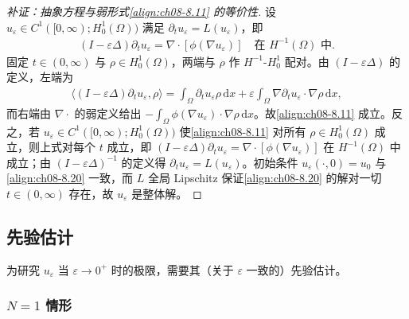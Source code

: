\documentclass[../../main.tex]{subfiles}%
\begin{document}
\begin{proof}[补证：抽象方程与弱形式\eqref{align:ch08-8.11} 的等价性]
设 $u_\varepsilon\in C^1([0,\infty);H^1_0(\Omega))$ 满足 $\partial_tu_\varepsilon=L(u_\varepsilon)$，即
\begin{align*}
(I-\varepsilon\Delta)\partial_tu_\varepsilon=\nabla\cdot[\phi(\nabla u_\varepsilon)]
\quad\text{在 }H^{-1}(\Omega)\text{ 中}.
\end{align*}
固定 $t\in(0,\infty)$ 与 $\rho\in H^1_0(\Omega)$，两端与 $\rho$ 作 $H^{-1}$-$H^1_0$ 配对。由 $(I-\varepsilon\Delta)$ 的定义，左端为
\begin{align*}
\langle(I-\varepsilon\Delta)\partial_tu_\varepsilon,\rho\rangle
=\int_\Omega\partial_tu_\varepsilon\rho\,\mathrm{d}x
+\varepsilon\int_\Omega\nabla\partial_tu_\varepsilon\cdot\nabla\rho\,\mathrm{d}x,
\end{align*}
而右端由 $\nabla\cdot$ 的弱定义给出 $-\int_\Omega\phi(\nabla u_\varepsilon)\cdot\nabla\rho\,\mathrm{d}x$。故\eqref{align:ch08-8.11} 成立。反之，若 $u_\varepsilon\in C^1([0,\infty);H^1_0(\Omega))$ 使\eqref{align:ch08-8.11} 对所有 $\rho\in H^1_0(\Omega)$ 成立，则上式对每个 $t$ 成立，即 $(I-\varepsilon\Delta)\partial_tu_\varepsilon=\nabla\cdot[\phi(\nabla u_\varepsilon)]$ 在 $H^{-1}(\Omega)$ 中成立；由 $(I-\varepsilon\Delta)^{-1}$ 的定义得 $\partial_tu_\varepsilon=L(u_\varepsilon)$。初始条件 $u_\varepsilon(\cdot,0)=u_0$ 与\eqref{align:ch08-8.20} 一致，而 $L$ 全局 Lipschitz 保证\eqref{align:ch08-8.20} 的解对一切 $t\in(0,\infty)$ 存在，故 $u_\varepsilon$ 是整体解。
\end{proof}

\subsection{先验估计}\label{subsection:ch08-先验估计}

为研究 $u_\varepsilon$ 当 $\varepsilon\to0^+$ 时的极限，需要其（关于 $\varepsilon$ 一致的）先验估计。

\subsubsection{$N=1$ 情形}\label{subsubsection:ch08-N1估计}
\end{document}
